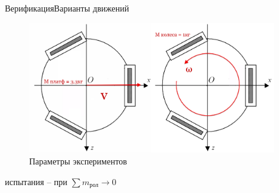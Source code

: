 \begin{frame}{Верификация}{Варианты движений}
    \begin{figure}[!ht]
        \centering
        \includegraphics[width=0.95\textwidth]{content/parts/3_friction/diploma/img/art/my_exp_setup.png}
        \caption{Параметры экспериментов}
        \label{fig:my_exp_setup}
    \end{figure}
    испытания -- при $\sum m_{\text{рол}} \rightarrow 0$
\end{frame}

